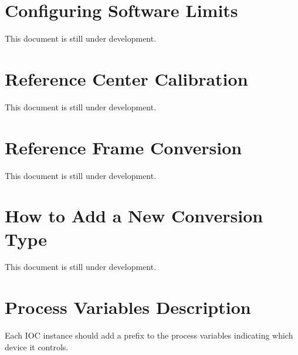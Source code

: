 \documentclass[openany]{article}
\begin{document}
\section{Configuring Software Limits}

    This document is still under development.

\section{Reference Center Calibration}

    This document is still under development.

\section{Reference Frame Conversion}

    This document is still under development.

\section{How to Add a New Conversion Type}

    This document is still under development.

\newpage
\section{Process Variables Description}\label{sec:process-variables}

    Each IOC instance should add a prefix to the process variables indicating which device it controls.
\end{document}
